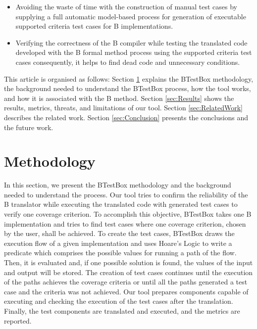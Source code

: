 \documentclass[runningheads]{llncs}
\begin{document}
\begin{itemize}
    \item Avoiding the waste of time with the construction of manual test cases by supplying a full automatic model-based process for generation of executable supported criteria test cases for B implementations.%
    \item Verifying the correctness of the B compiler while testing the translated code developed with the B formal method process using the supported criteria test cases consequently, it helps to find dead code and unnecessary conditions.
\end{itemize}

This article is organised as follows: %
Section \ref{sec:BTestBox} explains the BTestBox methodology, the background needed to understand the BTestBox process, how the tool works, and how it is associated with the B method. Section \ref{sec:Results} shows the results, metrics, threats, and limitations of our tool. Section \ref{sec:RelatedWork} describes the related work. Section \ref{sec:Conclusion} presents the conclusions and the future work.

\section{Methodology} \label{sec:BTestBox}

In this section, we present the BTestBox methodology and the background needed to understand the process. Our tool tries to confirm the reliability of the B translator while executing the translated code with generated test cases to verify one coverage criterion. To accomplish this objective, BTestBox takes one B implementation and tries to find test cases where one coverage criterion, chosen by the user, shall be achieved. To create the test cases, BTestBox draws the execution flow of a given implementation and uses Hoare's Logic to write a predicate which comprises the possible values for running a path of the flow. Then, it is evaluated and, if one possible solution is found, the values of the input and output will be stored. The creation of test cases continues until the execution of the paths achieves the coverage criteria or until all the paths generated a test case and the criteria was not achieved. Our tool prepares components capable of executing and checking the execution of the test cases after the translation. Finally, the test components are translated and executed, and the metrics are reported.
\end{document}
